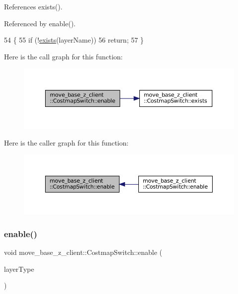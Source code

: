 References exists().



Referenced by enable().


\begin{DoxyCode}
54 \{
55     \textcolor{keywordflow}{if} (!\hyperlink{classmove__base__z__client_1_1CostmapSwitch_a3898ad9aa2ecf59d29a99e152f21a0d4}{exists}(layerName))
56         \textcolor{keywordflow}{return};
57 \}
\end{DoxyCode}
Here is the call graph for this function\+:
\nopagebreak
\begin{figure}[H]
\begin{center}
\leavevmode
\includegraphics[width=350pt]{classmove__base__z__client_1_1CostmapSwitch_ab605fa05a9e899c58f8502990e91586a_cgraph}
\end{center}
\end{figure}
Here is the caller graph for this function\+:
\nopagebreak
\begin{figure}[H]
\begin{center}
\leavevmode
\includegraphics[width=350pt]{classmove__base__z__client_1_1CostmapSwitch_ab605fa05a9e899c58f8502990e91586a_icgraph}
\end{center}
\end{figure}
\mbox{\label{classmove__base__z__client_1_1CostmapSwitch_a4f67bece32c5a66222bda0144d8f74d5}} 
\subsubsection{\texorpdfstring{enable()}{enable()}\hspace{0.1cm}{\footnotesize\ttfamily [2/2]}}
{\footnotesize\ttfamily void move\+\_\+base\+\_\+z\+\_\+client\+::\+Costmap\+Switch\+::enable (\begin{DoxyParamCaption}\item[{\hyperlink{classmove__base__z__client_1_1CostmapSwitch_a810338d2ba3fe25fc4ecf8c6c85b462b}{Standard\+Layers}}]{layer\+Type }\end{DoxyParamCaption})}



